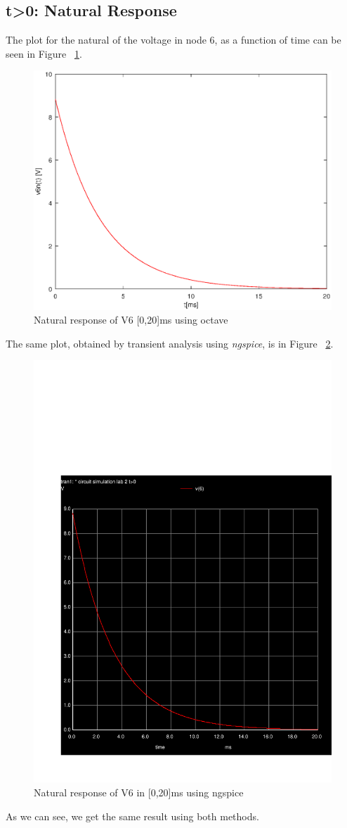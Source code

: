 \subsection{t\textgreater0: Natural Response}
The plot for the natural of the voltage in node 6, as a function of time can be seen in Figure ~\ref{fig:rc1}.\\
\begin{figure}[H] \centering
\includegraphics[width=0.4\linewidth]{natural.eps}
\caption{Natural response of V6 [0,20]ms using octave}
\label{fig:rc1}
\end{figure}

The same plot, obtained by transient analysis using \textit{ngspice}, is in Figure ~\ref{fig:rc2}.\\
\begin{figure}[H] \centering
\includegraphics[width=0.4\linewidth]{../sim/trans.pdf}
\caption{Natural response of V6 in [0,20]ms using ngspice}
\label{fig:rc2}
\end{figure}
As we can see, we get the same result using both methods.


